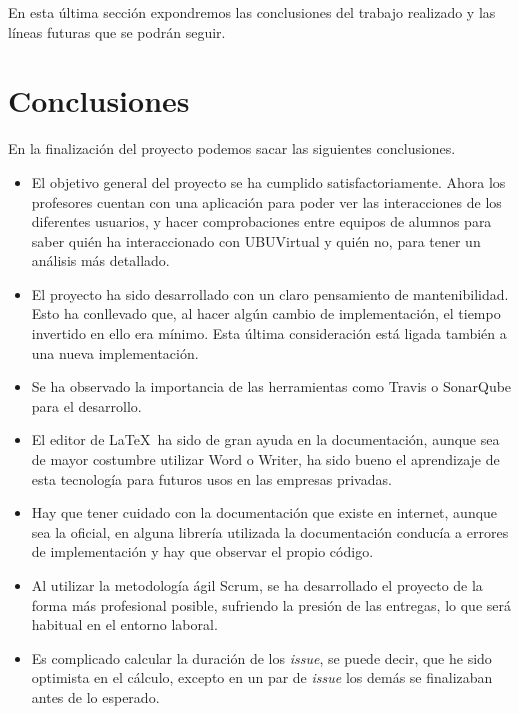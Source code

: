 
En esta última sección expondremos las conclusiones del trabajo realizado y las líneas futuras que se podrán seguir.

\section{Conclusiones}\label{conclusiones}

En la finalización del proyecto podemos sacar las siguientes conclusiones.

\begin{itemize}
	\tightlist
	\item
	El objetivo general del proyecto se ha cumplido satisfactoriamente.
	Ahora los profesores cuentan con una aplicación para poder ver las interacciones de los diferentes usuarios, y hacer comprobaciones entre equipos de alumnos para saber quién ha interaccionado con UBUVirtual y quién no, para tener un análisis más detallado.
	\item
	El proyecto ha sido desarrollado con un claro pensamiento de mantenibilidad. Esto ha conllevado que, al hacer algún cambio de implementación, el tiempo invertido en ello era mínimo. Esta última consideración está ligada también a una nueva implementación.
	\item
	Se ha observado la importancia de las herramientas como Travis o SonarQube para el desarrollo.
	\item
	El editor de \LaTeX\ ha sido de gran ayuda en la documentación, aunque sea de mayor costumbre utilizar Word o Writer, ha sido bueno el aprendizaje de esta tecnología para futuros usos en las empresas privadas.
	\item
	Hay que tener cuidado con la documentación que existe en internet, aunque sea la oficial, en alguna librería utilizada la documentación conducía a errores de implementación y hay que observar el propio código.
	\item
	Al utilizar la metodología ágil Scrum, se ha desarrollado el proyecto de la forma más profesional posible, sufriendo la presión de las entregas, lo que será habitual en el entorno laboral.
	\item
	Es complicado calcular la duración de los \emph{issue}, se puede decir, que he sido optimista en el cálculo, excepto en un par de \emph{issue} los demás se finalizaban antes de lo esperado.
	
\end{itemize}

